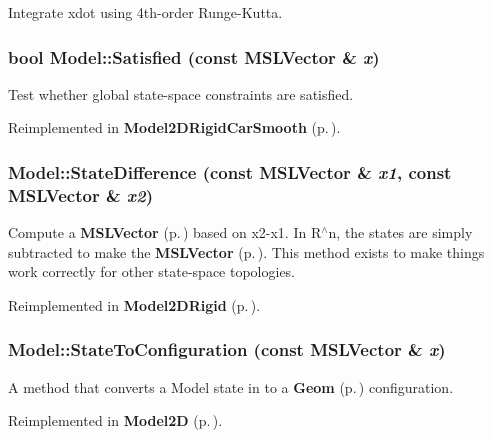 Integrate xdot using 4th-order Runge-Kutta.

\subsubsection{\setlength{\rightskip}{0pt plus 5cm}bool Model::Satisfied (const {\bf MSLVector} \& {\em x})\hspace{0.3cm}{\tt  [virtual]}}\label{classModel_a4}


Test whether global state-space constraints are satisfied.



Reimplemented in {\bf Model2DRigid\-Car\-Smooth} {\rm (p.\,\pageref{classModel2DRigidCarSmooth_a5})}.
\subsubsection{ Model::State\-Difference (const {\bf MSLVector} \& {\em x1}, const {\bf MSLVector} \& {\em x2})\hspace{0.3cm}{\tt  [virtual]}}\label{classModel_a7}


Compute a {\bf MSLVector} {\rm (p.\,\pageref{classMSLVector})} based on x2-x1. In R$^\wedge$n, the states are simply subtracted to make the {\bf MSLVector} {\rm (p.\,\pageref{classMSLVector})}. This method exists to make things work correctly for other state-space topologies.



Reimplemented in {\bf Model2DRigid} {\rm (p.\,\pageref{classModel2DRigid_a5})}.
\subsubsection{ Model::State\-To\-Configuration (const {\bf MSLVector} \& {\em x})\hspace{0.3cm}{\tt  [virtual]}}\label{classModel_a8}


A method that converts a Model state in to a {\bf Geom} {\rm (p.\,\pageref{classGeom})} configuration.



Reimplemented in {\bf Model2D} {\rm (p.\,\pageref{classModel2D_a2})}.
